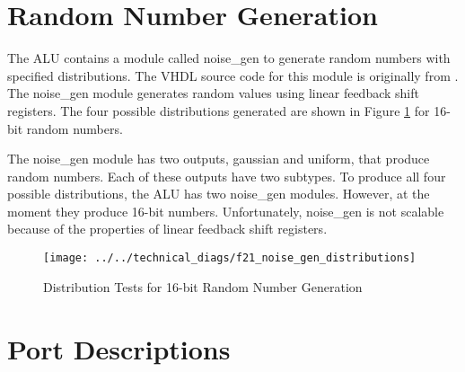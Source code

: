 \documentclass[]{report}
\begin{document}
\clearpage
\section{Random Number Generation}

The ALU contains a module called noise\_gen to generate random numbers with specified distributions. The VHDL source code for this module is originally from \cite{noise gen site}. The noise\_gen module generates random values using linear feedback shift registers. The four possible distributions generated are shown in Figure \ref{fig:noise gen distributions} for 16-bit random numbers.

The noise\_gen module has two outputs, gaussian and uniform, that produce random numbers. Each of these outputs have two subtypes. To produce all four possible distributions, the ALU has two noise\_gen modules. However, at the moment they produce 16-bit numbers. Unfortunately, noise\_gen is not scalable because of the properties of linear feedback shift registers.  

\begin{figure}[h]
	\centering
	\texttt{[image: ../../technical\_diags/f21\_noise\_gen\_distributions]}
	\caption{Distribution Tests for 16-bit Random Number Generation}
	\label{fig:noise gen distributions}
\end{figure}

\section{Port Descriptions}
\end{document}
